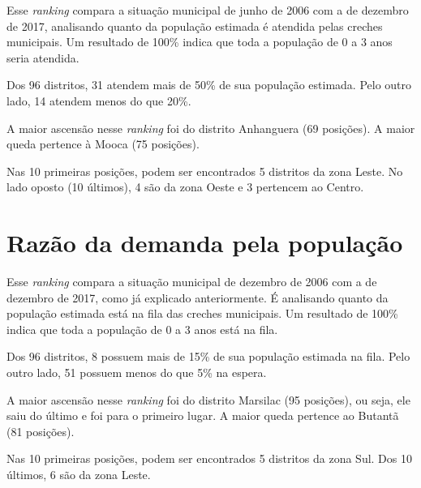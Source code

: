 Esse \textit{ranking} compara a situação municipal de junho de 2006 com a de dezembro de 2017, analisando quanto da população estimada é atendida pelas creches municipais. Um resultado de 100\% indica que toda a população de 0 a 3 anos seria atendida.

Dos 96 distritos, 31 atendem mais de 50\% de sua população estimada. Pelo outro lado, 14 atendem menos do que 20\%. 

A maior ascensão nesse \textit{ranking} foi do distrito Anhanguera (69 posições). A maior queda pertence à Mooca (75 posições).

Nas 10 primeiras posições, podem ser encontrados 5 distritos da zona Leste. No lado oposto (10 últimos), 4 são da zona Oeste e 3 pertencem ao Centro.

\section{Razão da demanda pela população}

Esse \textit{ranking} compara a situação municipal de dezembro de 2006 com a de dezembro de 2017, como já explicado anteriormente. É analisando quanto da população estimada está na fila das creches municipais. Um resultado de 100\% indica que toda a população de 0 a 3 anos está na fila.

Dos 96 distritos, 8 possuem mais de 15\% de sua população estimada na fila. Pelo outro lado, 51 possuem menos do que 5\% na espera. 

A maior ascensão nesse \textit{ranking} foi do distrito Marsilac (95 posições), ou seja, ele saiu do último e foi para o primeiro lugar. A maior queda pertence ao Butantã (81 posições).

Nas 10 primeiras posições, podem ser encontrados 5 distritos da zona Sul. Dos 10 últimos, 6 são da zona Leste.